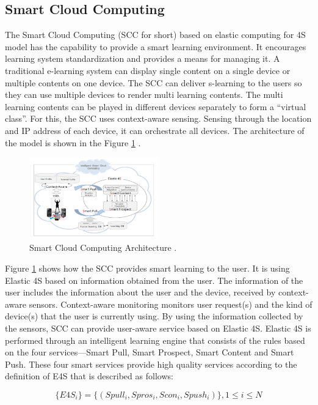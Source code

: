 \documentclass[journal]{vgtc}                %
\begin{document}
  \subsection{Smart Cloud Computing}
  The Smart Cloud Computing (SCC for short) based on elastic computing for 4S model has the capability to provide a smart learning environment. It encourages learning system standardization and provides a means for managing it. A traditional e-learning system can display single content on a single device or multiple contents on one device. The SCC can deliver s-learning to the users so they can use multiple devices to render multi learning contents. The multi learning contents can be played in different devices separately to form a “virtual class”. For this, the SCC uses context-aware sensing. Sensing through the location and IP address of each device, it can orchestrate all devices. The architecture of the model is shown in the Figure \ref{scc} \cite{s110807835}.

  \begin{figure}[htb]
    \centering
    \includegraphics[width=0.5\textwidth]{scc}
    \caption{Smart Cloud Computing Architecture \cite{s110807835}.}
    \label{scc}
  \end{figure}

  Figure \ref{scc} shows how the SCC provides smart learning to the user. It is using Elastic 4S based on information obtained from the user. The information of the user includes the information about the user and the device, received by context-aware sensors. Context-aware monitoring monitors user request(s) and the kind of device(s) that the user is currently using. By using the information collected by the sensors, SCC can provide user-aware service based on Elastic 4S. Elastic 4S is performed through an intelligent learning engine that consists of the rules based on the four services—Smart Pull, Smart Prospect, Smart Content and Smart Push. These four smart services provide high quality services according to the definition of E4S that is described as follows:

  \begin{equation}
    \{E4S_i\}=\{(Spull_i , Spros_i, Scon_i, Spush_i)\}, 1\leq i \leq N
  \end{equation}
\end{document}
